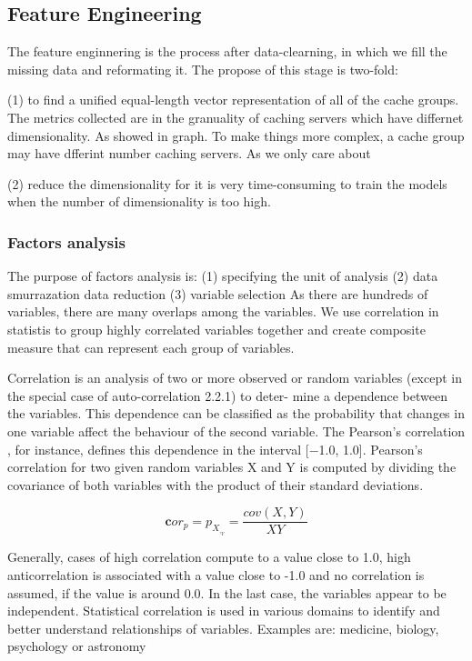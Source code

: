 \documentclass[5p]{elsarticle}
\begin{document}
\subsection{Feature Engineering}
The feature enginnering is the process after data-clearning, in which we fill the missing data and reformating it. The propose of this stage is two-fold:

(1) to find a unified equal-length vector representation of all of the cache groups. 
The metrics collected are in the granuality of caching servers which have differnet dimensionality. As showed in graph. To make things more complex, a cache group may have dfferint number caching servers. As we only care about

(2) reduce the dimensionality for it is very time-consuming to train the models when the number of dimensionality is too high.

\subsubsection{Factors analysis}
The purpose of factors analysis is: (1) specifying the unit of analysis (2) data smurrazation data reduction (3) variable selection
As there are hundreds of variables, there are many overlaps among the variables. We use correlation in statistis to group highly correlated variables together and create composite measure that can represent each group of variables.

Correlation is an analysis of two or more observed or random variables (except in the special case of auto-correlation 2.2.1) to deter- mine a dependence between the variables. This dependence can be classified as the probability that changes in one variable affect the behaviour of the second variable. The Pearson’s correlation , for instance, defines this dependence in the interval [−1.0, 1.0]. Pearson’s correlation for two given random variables X and Y is computed by dividing the covariance of both variables with the product of their standard deviations.

\begin{equation}
	\mathbf cor_p=p_X_,_Y = \frac{cov(X,Y)}{XY}
\end{equation}

Generally, cases of high correlation compute to a value close to 1.0, high anticorrelation is associated with a value close to -1.0 and no correlation is assumed, if the value is around 0.0. In the last case, the variables appear to be independent. Statistical correlation is used in various domains to identify and better understand relationships of variables. Examples are: medicine, biology, psychology or astronomy
\end{document}
